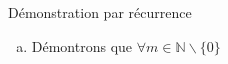 \documentclass{report}
\begin{document}

\section{} %
  D\'{e}monstration par r\'{e}currence

  \begin{enumerate}[a. ]
  \addtocounter{enumi}{1} %
  \item D\'{e}montrons que $\forall m \in \mathbb{N} \backslash  \big\{0\big\} $


  
  \end{enumerate}

 
 
\end{document}

